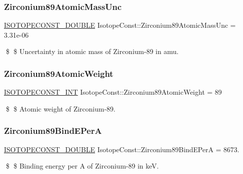 \subsubsection{\texorpdfstring{Zirconium89\+Atomic\+Mass\+Unc}{Zirconium89AtomicMassUnc}}
{\footnotesize\ttfamily \mbox{\hyperlink{group___isotope_const-_macros_ga8f45a7272ce02c0b4c65c44636ed719a}{I\+S\+O\+T\+O\+P\+E\+C\+O\+N\+S\+T\+\_\+\+D\+O\+U\+B\+LE}} Isotope\+Const\+::\+Zirconium89\+Atomic\+Mass\+Unc = 3.\+31e-\/06}

\$ \$ Uncertainty in atomic mass of Zirconium-\/89 in amu. \mbox{\label{group___isotope_const-_zirconium-_zr89_ga3e654d42f11c0e6c82bce9b8e297a088}} 
\subsubsection{\texorpdfstring{Zirconium89\+Atomic\+Weight}{Zirconium89AtomicWeight}}
{\footnotesize\ttfamily \mbox{\hyperlink{group___isotope_const-_macros_ga5f18360b3e99483a35c32d789e62621c}{I\+S\+O\+T\+O\+P\+E\+C\+O\+N\+S\+T\+\_\+\+I\+NT}} Isotope\+Const\+::\+Zirconium89\+Atomic\+Weight = 89}

\$ \$ Atomic weight of Zirconium-\/89. \mbox{\label{group___isotope_const-_zirconium-_zr89_ga4fb3978872fee7f585a2b770e87b82b1}} 
\subsubsection{\texorpdfstring{Zirconium89\+Bind\+E\+PerA}{Zirconium89BindEPerA}}
{\footnotesize\ttfamily \mbox{\hyperlink{group___isotope_const-_macros_ga8f45a7272ce02c0b4c65c44636ed719a}{I\+S\+O\+T\+O\+P\+E\+C\+O\+N\+S\+T\+\_\+\+D\+O\+U\+B\+LE}} Isotope\+Const\+::\+Zirconium89\+Bind\+E\+PerA = 8673.}

\$ \$ Binding energy per A of Zirconium-\/89 in keV. \mbox{\label{group___isotope_const-_zirconium-_zr89_ga69f1d85e0049f12e233fde5679200007}} 
